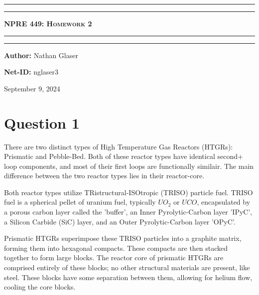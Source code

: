 \documentclass{article}
\begin{document}
\begin{titlepage}

\centering
\scshape
\vspace{\baselineskip}

%
\rule{\textwidth}{1.6pt}\vspace*{-\baselineskip}\vspace*{2pt}
\rule{\textwidth}{0.4pt}

{\Huge \textbf{\textsc{NPRE 449: Homework 2 \\
\vspace{15pt}}}}

\rule{\textwidth}{0.4pt}\vspace*{-\baselineskip}\vspace{3.2pt}
\rule{\textwidth}{1.6pt}\vspace{6pt}
\vspace{1.5\baselineskip}


\large \centerline{\textbf{Author:} Nathan Glaser}
\large \centerline{\textbf{Net-ID:} nglaser3}
\quad

\vfill
\large \centerline{September 9, 2024}
%
\end{titlepage}

\tableofcontents
\newpage
{}

\section*{Question 1}

There are two distinct types of High Temperature Gas Reactors (HTGRs): Prismatic and Pebble-Bed. Both of these reactor types have identical second+ loop components, and most of their first loops are functionally similair. The main difference between the two reactor types lies in their reactor-core. 

Both reactor types utilize TRistructural-ISOtropic (TRISO) particle fuel. TRISO fuel is a spherical pellet of uranium fuel, typically $UO_2$ or $UCO$, encapsulated by a porous carbon layer called the 'buffer', an Inner Pyrolytic-Carbon layer 'IPyC', a Silicon Carbide (SiC) layer, and an Outer Pyrolytic-Carbon layer 'OPyC'.

Prismatic HTGRs superimpose these TRISO particles into a graphite matrix, forming them into hexagonal compacts. These compacts are then stacked together to form large blocks. The reactor core of prismatic HTGRs are comprised entirely of these blocks; no other structural materials are present, like steel. These blocks have some separation between them, allowing for helium flow, cooling the core blocks. 
\end{document}
